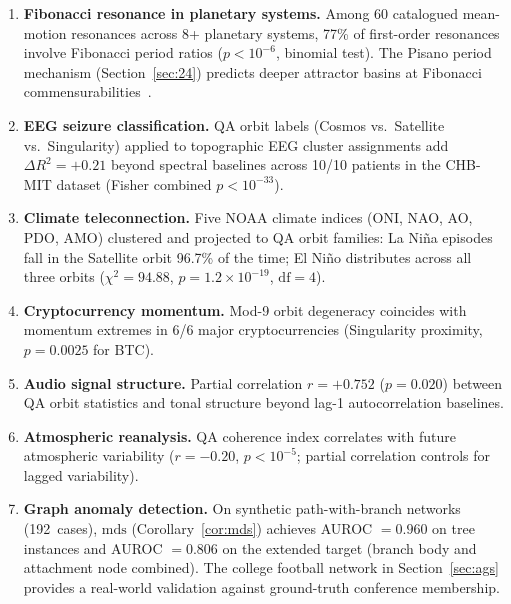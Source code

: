 \documentclass[11pt]{article}
\begin{document}
\begin{enumerate}[label=(\roman*)]
  \item \textbf{Fibonacci resonance in planetary systems.}  Among 60 catalogued mean-motion resonances across 8+ planetary systems, 77\% of first-order resonances involve Fibonacci period ratios ($p < 10^{-6}$, binomial test).  The Pisano period mechanism (Section~\ref{sec:24}) predicts deeper attractor basins at Fibonacci commensurabilities~\cite{dale2026fib}.

  \item \textbf{EEG seizure classification.}  QA orbit labels (Cosmos vs.\ Satellite vs.\ Singularity) applied to topographic EEG cluster assignments add $\Delta R^2 = +0.21$ beyond spectral baselines across 10/10 patients in the CHB-MIT dataset (Fisher combined $p < 10^{-33}$).

  \item \textbf{Climate teleconnection.}  Five NOAA climate indices (ONI, NAO, AO, PDO, AMO) clustered and projected to QA orbit families: La Ni\~na episodes fall in the Satellite orbit 96.7\% of the time; El Ni\~no distributes across all three orbits ($\chi^2 = 94.88$, $p = 1.2 \times 10^{-19}$, $\text{df}=4$).

  \item \textbf{Cryptocurrency momentum.}  Mod-9 orbit degeneracy coincides with momentum extremes in 6/6 major cryptocurrencies (Singularity proximity, $p = 0.0025$ for BTC).

  \item \textbf{Audio signal structure.}  Partial correlation $r = +0.752$ ($p = 0.020$) between QA orbit statistics and tonal structure beyond lag-1 autocorrelation baselines.

  \item \textbf{Atmospheric reanalysis.}  QA coherence index correlates with future atmospheric variability ($r = -0.20$, $p < 10^{-5}$; partial correlation controls for lagged variability).

  \item \textbf{Graph anomaly detection.}  On synthetic path-with-branch networks (192~cases), $\mathrm{mds}$ (Corollary~\ref{cor:mds}) achieves AUROC $= 0.960$ on tree instances and AUROC $= 0.806$ on the extended target (branch body and attachment node combined).  The college football network in Section~\ref{sec:ags} provides a real-world validation against ground-truth conference membership.
\end{enumerate}
\end{document}

